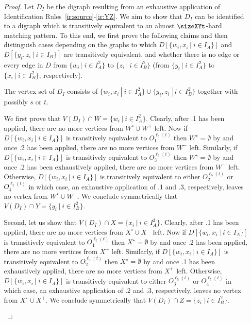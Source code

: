 \begin{proof}
Let $D_I$ be the digraph resulting from an exhaustive application of Identification Rules~\ref{ir:source}-\ref{ir:YZ}. 
We aim to show that $D_I$ can be identified to a digraph which is transitively equivalent to an almost $\sizeXYt$-hard matching pattern. To this end, we first prove the following claims and then
distinguish cases depending on the graphs to which $D[\{w_i,x_i~|~i \in I_A\}]$ and $D[\{y_i,z_i~|~i \in I_B\}]$ are transitively equivalent, and whether there is no edge or every edge in $D$ from $\{w_i~|~i \in I_A^2\}$ to $\{z_i~|~i \in I_B^2\}$ (from $\{y_i~|~i \in I_A^2\}$ to $\{x_i~|~i \in I_B^2\}$, respectively).

\begin{claim}
\label{clm:vertexsetDI}
The vertex set of $D_I$ consists of $\{w_i,x_i~|~i \in I_A^2\} \cup \{y_i,z_i~|~i \in I_B^2\}$ together with possibly $s$ or $t$. 
\end{claim}

\begin{claimproof}
We first prove that $V(D_I) \cap W = \{w_i~|~i \in I_A^2\}$. 
Clearly, after .1 has been applied, there are no more vertices from $W^\circ \cup W^+$ left.
Now if $D[\{w_i,x_i~|~i \in I_A\}]$ is transitively equivalent to $O_1^{\ell_5(t)}$
then $W^\star = \emptyset$ by  and once .2 has been applied, there are no more vertices from $W^-$ left.
Similarly, if $D[\{w_i,x_i~|~i \in I_A\}]$ is transitively equivalent to $O_3^{\ell_5(t)}$
then $W^\star = \emptyset$ by  and once .2 has been exhaustively applied, 
there are no more vertices from $W^-$ left. 
Otherwise, $D[\{w_i,x_i~|~i \in I_A\}]$ is transitively equivalent to either $O_2^{\ell_5(t)}$ or $O_4^{\ell_5(t)}$ in which case, an exhaustive application of .1 and .3, respectively, leaves no vertex from $W^\star \cup W^-$.
We conclude symmetrically that $V(D_I) \cap Y = \{y_i~|~i \in I_B^2\}$.

Second, let us show that $V(D_I) \cap X = \{x_i~|~i \in I_A^2\}$.
Clearly, after .1 has been applied, there are no more vertices from $X^\circ \cup X^-$ left. 
Now if $D[\{w_i,x_i~|~i \in I_A\}]$ is transitively equivalent to $O_1^{\ell_5(t)}$
then $X^\star = \emptyset$ by  and once .2 has been applied, there are no more vertices from $X^+$ left.
Similarly, if $D[\{w_i,x_i~|~i \in I_A\}]$ is transitively equivalent to $O_2^{\ell_5(t)}$
then $X^\star = \emptyset$ by  and once .1 has been exhaustively applied, 
there are no more vertices from $X^+$ left. 
Otherwise, $D[\{w_i,x_i~|~i \in I_A\}]$ is transitively equivalent to either $O_3^{\ell_5(t)}$ or $O_4^{\ell_5(t)}$ in which case, an exhaustive application of .2 and .3, respectively, leaves no vertex from $X^\star \cup X^+$.
We conclude symmetrically that $V(D_I) \cap Z = \{z_i~|~i \in I_B^2\}$.
\end{claimproof}


\end{proof}

